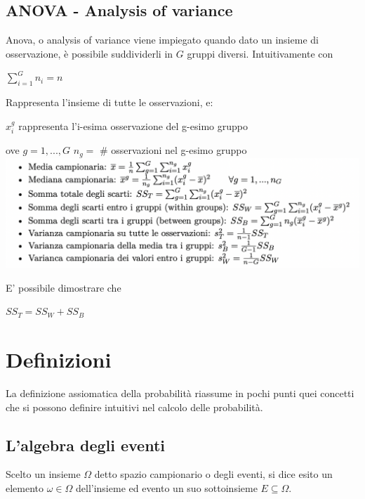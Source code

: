 \subsection{ANOVA - Analysis of variance}
Anova, o analysis of variance viene impiegato quando dato un insieme di osservazione, è possibile suddividerli in $G$ gruppi diversi. Intuitivamente con \begin{center}
$\sum_{i=1}^G n_i = n$
\end{center}
Rappresenta l'insieme di tutte le osservazioni, e:
\begin{center}
$x_i^g$ rappresenta l'i-esima osservazione del g-esimo gruppo
\end{center}
ove $g = 1, ..., G$ \hfill $n_g =$ \# osservazioni nel g-esimo gruppo
\includegraphics[scale=0.7]{anova}

E' possibile dimostrare che\begin{center}
$SS_T = SS_W + SS_B$
\end{center}





\section{Definizioni}
La definizione assiomatica della probabilità riassume in pochi punti quei concetti che si possono definire intuitivi nel calcolo delle probabilità.

\subsection{L'algebra degli eventi}
\begin{defin}
	Scelto un insieme $\Omega$ detto spazio campionario o degli eventi, si dice esito un elemento $\omega\in\Omega$ dell'insieme ed evento un suo sottoinsieme $E\subseteq\Omega$.

\end{defin}
